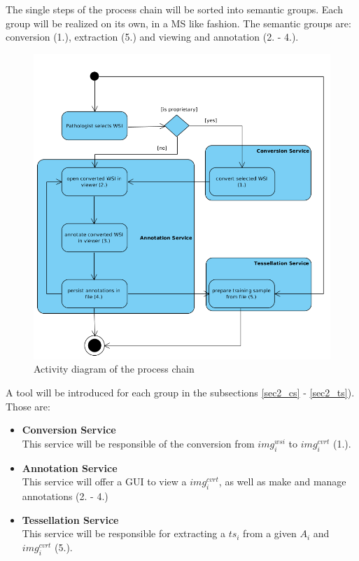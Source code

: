 The single steps of the process chain will be sorted into semantic groups. Each group will be realized on its own, in a MS like fashion. The semantic groups are: conversion (1.), extraction (5.) and viewing and annotation (2. - 4.).

\begin{figure}[H]
	\begin{center}
		\includegraphics[scale=0.4]{img/processChainUML.png}
		\caption{Activity diagram of the process chain}
		\label{fig2_processChainUML}
	\end{center}
\end{figure}

A tool will be introduced for each group in the subsections \ref{sec2_cs} - \ref{sec2_ts}). Those are:

\begin{itemize}
	\item \textbf{Conversion Service}\\
	This service will be responsible of the conversion from $img^{wsi}_i$ to $img^{cvrt}_i$ (1.).
	\item \textbf{Annotation Service}\\
	This service will offer a GUI to view a $img^{cvrt}_i$, as well as make and manage annotations (2. - 4.)
	\item \textbf{Tessellation Service}\\
	This service will be responsible for extracting a $ts_i$ from a given $A_i$ and $img^{cvrt}_i$ (5.).
\end{itemize}


